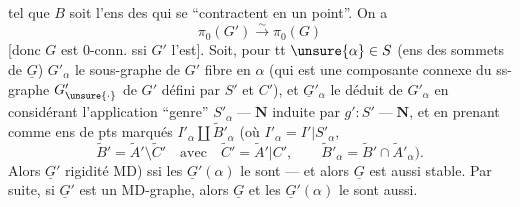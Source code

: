 tel que $B$ soit l'ens des   qui se ``contractent en un point''. On a
\[
\pi_0(G')\overset{\sim}{\longrightarrow}\pi_0(G)
\]
[donc $G$ est $0$-conn. ssi $G'$ l'est].  Soit, pour tt $\unsure{\alpha}\in S$ (ens des sommets de $\underline{G}$) $G'_\alpha$ le sous-graphe de $G'$ fibre en $\alpha$ (qui est une composante connexe du ss-graphe $G'_{\unsure{\cdot}}$ de $G'$ défini par $S'$ et $C'$), et $\underline{G}'_\alpha$ le  déduit de $G'_\alpha$ en considérant l'application ``genre'' $S'_\alpha\mathbin{\text{---}}\mathbf{N}$ induite par $g':S'\mathbin{\text{---}}\mathbf{N}$, et en prenant comme ens de pts marqués $I'_\alpha\amalg\widetilde{B}'_\alpha$ (où $I'_\alpha=I'|S'_\alpha$,
\[
\widetilde{B}'=\widetilde{A}'\setminus\widetilde{C}'\quad\text{avec}\quad
\widetilde{C}'=\widetilde{A}'|C',\qquad
\widetilde{B}'_\alpha=\widetilde{B}'\cap\widetilde{A}'_\alpha).
\]
Alors $\underline{G}'$   rigidité MD) ssi les $\underline{G}'(\alpha)$ le sont --- et alors $\underline{G}$ est aussi stable. Par suite, si $\underline{G}'$ est un MD-graphe, alors $\underline{G}$ et les $\underline{G}'(\alpha)$ le sont aussi.
